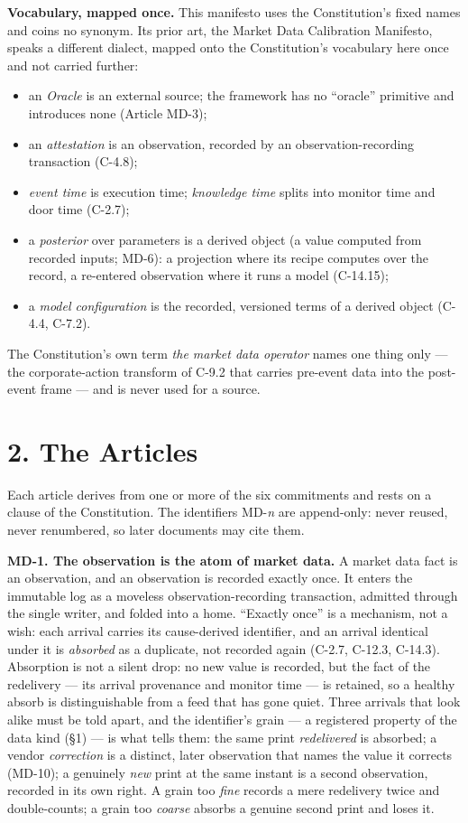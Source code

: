 \documentclass[11pt,a4paper]{article}
\newcommand{\mlabel}[1]{\leavevmode\hypertarget{md-#1}{}%
  \marginpar{\raggedright\scriptsize\ttfamily\textcolor{gray}{#1}}}
\providecommand{\tightlist}{\setlength{\itemsep}{2pt}\setlength{\parskip}{0pt}}
\begin{document}
\textbf{Vocabulary, mapped once.} This manifesto uses the Constitution's
fixed names and coins no synonym. Its prior art, the Market Data
Calibration Manifesto, speaks a different dialect, mapped onto the
Constitution's vocabulary here once and not carried further:
\begin{itemize}
\tightlist
\item an \emph{Oracle} is an external source; the framework has no
  ``oracle'' primitive and introduces none (Article MD-3);
\item an \emph{attestation} is an observation, recorded by an
  observation-recording transaction (C-4.8);
\item \emph{event time} is execution time; \emph{knowledge time} splits
  into monitor time and door time (C-2.7);
\item a \emph{posterior} over parameters is a derived object (a value
  computed from recorded inputs; MD-6): a projection where its recipe
  computes over the record, a re-entered observation where it runs a
  model (C-14.15);
\item a \emph{model configuration} is the recorded, versioned terms of a
  derived object (C-4.4, C-7.2).
\end{itemize}
The Constitution's own term \emph{the market data operator} names one
thing only --- the corporate-action transform of C-9.2 that carries
pre-event data into the post-event frame --- and is never used for a
source.

\section{2. The Articles}

Each article derives from one or more of the six commitments and rests
on a clause of the Constitution. The identifiers MD-\emph{n} are
append-only: never reused, never renumbered, so later documents may cite
them.

\mlabel{MD-1}\textbf{MD-1. The observation is the atom of market data.}
A market data fact is an observation, and an observation is recorded
exactly once. It enters the immutable log as a moveless
observation-recording transaction, admitted through the single writer,
and folded into a home. ``Exactly once'' is a mechanism, not a wish: each
arrival carries its cause-derived identifier, and an arrival identical
under it is \emph{absorbed} as a duplicate, not recorded again (C-2.7,
C-12.3, C-14.3). Absorption is not a silent drop: no new value is
recorded, but the fact of the redelivery --- its arrival provenance and
monitor time --- is retained, so a healthy absorb is distinguishable from
a feed that has gone quiet. Three arrivals that look alike must be told
apart, and the identifier's grain --- a registered property of the data
kind (\S1) --- is what tells them: the same print \emph{redelivered} is
absorbed; a vendor \emph{correction} is a distinct, later observation
that names the value it corrects (MD-10); a genuinely \emph{new} print at
the same instant is a second observation, recorded in its own right. A
grain too \emph{fine} records a mere redelivery twice and double-counts;
a grain too \emph{coarse} absorbs a genuine second print and loses it.
\end{document}
